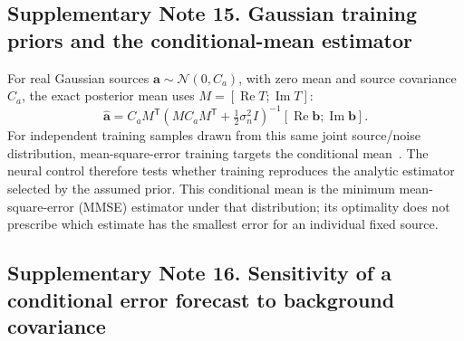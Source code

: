 \documentclass[pdflatex,sn-nature]{sn-jnl}%
\begin{document}
\begin{samepage}
\subsection*{Supplementary Note 15. Gaussian training priors and the conditional-mean estimator}

For real Gaussian sources $\bm a\sim\mathcal N(0,C_a)$, with zero mean
and source covariance $C_a$, the exact
posterior mean uses $M=[\operatorname{Re}T;\operatorname{Im}T]$:
\begin{equation}
 \hat{\bm a}=C_aM^{\mathsf T}
 (MC_aM^{\mathsf T}+\tfrac12\sigma_n^2I)^{-1}
 [\operatorname{Re}\bm b;\operatorname{Im}\bm b].
 \label{eq:mmse}
\end{equation}
For independent training samples drawn from this same joint source/noise distribution, mean-square-error training targets the conditional mean~\cite{bishop2006}. The neural control therefore tests whether training reproduces the analytic estimator selected by the assumed prior. This conditional mean is the minimum mean-square-error (MMSE) estimator under that distribution; its optimality does not prescribe which estimate has the smallest error for an individual fixed source.
\end{samepage}


\clearpage
\subsection*{Supplementary Note 16. Sensitivity of a conditional error forecast to background covariance}
\end{document}
